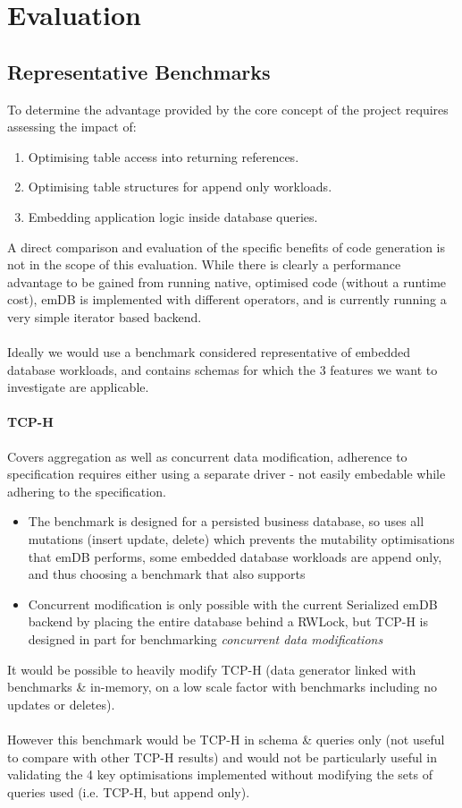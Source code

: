 \chapter{Evaluation}

\section{Representative Benchmarks}
To determine the advantage provided by the core concept of the project requires assessing the impact of:
\begin{enumerate}
    \setlength\itemsep{0em}
    \item Optimising table access into returning references.
    \item Optimising table structures for append only workloads.
    \item Embedding application logic inside database queries.
\end{enumerate}
A direct comparison and evaluation of the specific benefits of code generation is not in the scope of this evaluation.
While there is clearly a performance advantage to be gained from running native, optimised code (without a runtime cost), emDB
is implemented with different operators, and is currently running a very simple iterator based backend.
\\
\\ Ideally we would use a benchmark considered representative of embedded database workloads,
and contains schemas for which the 3 features we want to investigate are applicable.
\subsubsection{TCP-H}
Covers aggregation as well as concurrent data modification, adherence to specification
requires either using a separate driver - not easily embedable while adhering to the specification.
\begin{itemize}
    \setlength\itemsep{0em}
    \item The benchmark is designed for a persisted business database, so uses all mutations (insert update, delete)
          which prevents the mutability optimisations that emDB performs,
          some embedded database workloads are append only, and thus choosing a benchmark that also
          supports
    \item Concurrent modification is only possible with the current Serialized emDB backend by placing
          the entire database behind a RWLock, but TCP-H is designed in part for benchmarking \textit{concurrent data modifications}\cite{TCPHSpec}
\end{itemize}
It would be possible to heavily modify TCP-H (data generator linked with benchmarks \& in-memory, on a
low scale factor with benchmarks including no updates or deletes).
\\
\\ However this benchmark would be TCP-H in schema \& queries only (not useful to compare with other TCP-H results)
and would not be particularly useful in validating the 4 key optimisations implemented without modifying
the sets of queries used (i.e. TCP-H, but append only).

